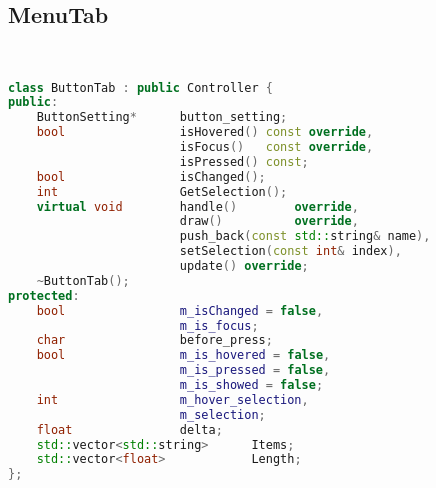 \subsection{MenuTab}
\begin{lstlisting}[language=C++]


class ButtonTab : public Controller {
public:
    ButtonSetting*      button_setting;
    bool                isHovered() const override,
                        isFocus()   const override,
                        isPressed() const;
    bool                isChanged();
    int                 GetSelection();
    virtual void        handle()        override,
                        draw()          override,
                        push_back(const std::string& name),
                        setSelection(const int& index),
                        update() override;
    ~ButtonTab();
protected:
    bool                m_isChanged = false,
                        m_is_focus;
    char                before_press;
    bool                m_is_hovered = false,
                        m_is_pressed = false,
                        m_is_showed = false;
    int                 m_hover_selection, 
                        m_selection;
    float               delta;
    std::vector<std::string>      Items;
    std::vector<float>            Length;
};






\end{lstlisting}
